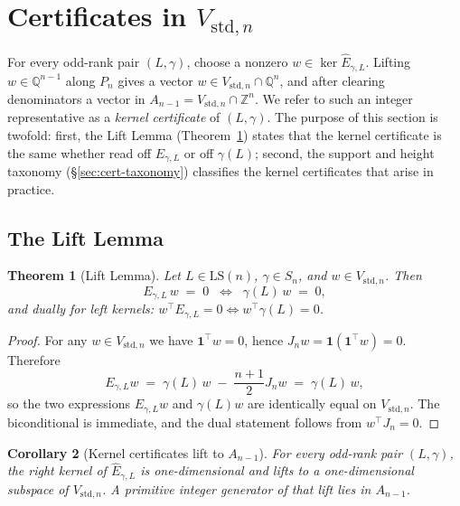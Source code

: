 \documentclass[11pt,a4paper]{article}
\newtheorem{theorem}{Theorem}[section]
\newtheorem{corollary}[theorem]{Corollary}
\theoremstyle{definition}
\theoremstyle{remark}
\providecommand{\one}{\mathbf{1}}
\providecommand{\Z}{\mathbb{Z}}
\providecommand{\Q}{\mathbb{Q}}
\newcommand{\Vstdn}{V_{\mathrm{std},n}}
\newcommand{\Egamma}{E_{\gamma,L}}
\newcommand{\Ehat}{\widehat{E}_{\gamma,L}}
\begin{document}
\section{\texorpdfstring{Certificates in $\Vstdn$}{Certificates in the standard subspace}}\label{sec:certificates}

For every odd-rank pair $(L, \gamma)$, choose a nonzero
$w \in \ker \Ehat$. Lifting $w \in \Q^{n-1}$ along $P_n$ gives a
vector $w \in \Vstdn \cap \Q^n$, and after clearing denominators a
vector in $A_{n-1} = \Vstdn \cap \Z^n$. We refer to such an integer
representative as a \emph{kernel certificate} of $(L, \gamma)$. The
purpose of this section is twofold: first, the Lift Lemma
(Theorem~\ref{thm:lift}) states that the kernel certificate is the
same whether read off $\Egamma$ or off $\gamma(L)$; second, the
support and height taxonomy
(\S\ref{sec:cert-taxonomy}) classifies the kernel certificates that
arise in practice.

\subsection{The Lift Lemma}\label{sec:cert-lift}

\begin{theorem}[Lift Lemma]\label{thm:lift}
Let $L \in \mathrm{LS}(n)$, $\gamma \in S_n$, and $w \in \Vstdn$.
Then
\begin{equation}\label{eq:lift-lemma}
   \Egamma\, w \;=\; 0
   \;\;\iff\;\;
   \gamma(L)\, w \;=\; 0,
\end{equation}
and dually for left kernels: $w^{\!\top} \Egamma = 0 \iff w^{\!\top}
\gamma(L) = 0$.
\end{theorem}

\begin{proof}
For any $w \in \Vstdn$ we have $\one^{\!\top} w = 0$, hence
$J_n w = \one (\one^{\!\top} w) = 0$. Therefore
\begin{equation*}
   \Egamma w \;=\; \gamma(L)\, w \;-\; \frac{n+1}{2} J_n w
              \;=\; \gamma(L)\, w,
\end{equation*}
so the two expressions $\Egamma w$ and $\gamma(L) w$ are identically
equal on $\Vstdn$. The biconditional is immediate, and the dual
statement follows from $w^{\!\top} J_n = 0$.
\end{proof}

\begin{corollary}[Kernel certificates lift to $A_{n-1}$]
\label{cor:cert-in-A}
For every odd-rank pair $(L, \gamma)$, the right kernel of $\Ehat$ is
one-dimensional and lifts to a one-dimensional subspace of $\Vstdn$.
A primitive integer generator of that lift lies in $A_{n-1}$.
\end{corollary}
\end{document}
